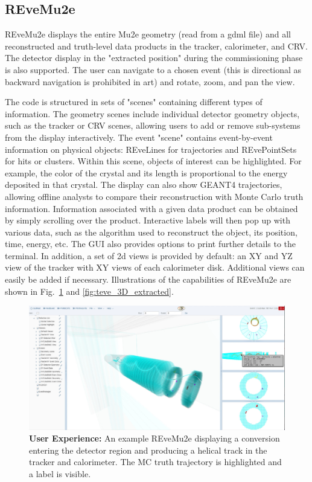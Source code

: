 \subsection{REveMu2e}

REveMu2e displays the entire Mu2e geometry (read from a gdml file) and all reconstructed and truth-level data products in the tracker, calorimeter, and CRV. The detector display in the "extracted position" during the commissioning phase is also supported. The user can navigate to a chosen event (this is directional as backward navigation is prohibited in art) and rotate, zoom, and pan the view. 

The code is structured in sets of "scenes" containing different types of information. The geometry scenes include individual detector geometry objects, such as the tracker or CRV scenes, allowing users to add or remove sub-systems from the display interactively. The event "scene" contains event-by-event information on physical objects: REveLines for trajectories and REvePointSets for hits or clusters. Within this scene, objects of interest can be highlighted. For example, the color of the crystal and its length is proportional to the energy deposited in that crystal. The display can also show GEANT4 trajectories, allowing offline analysts to compare their reconstruction with Monte Carlo truth information. Information associated with a given data product can be obtained by simply scrolling over the product. Interactive labels will then pop up with various data, such as the algorithm used to reconstruct the object, its position, time, energy, etc. The GUI also provides options to print further details to the terminal. In addition, a set of 2d views is provided by default: an XY and YZ view of the tracker with XY views of each calorimeter disk. Additional views can easily be added if necessary. Illustrations of the capabilities of REveMu2e are shown in Fig.~\ref{fig:teve_3D_label} and \ref{fig:teve_3D_extracted}. 

\begin{figure}[htb]
\begin{center}
\includegraphics[width=0.9\linewidth]{figures/2D-REve-label.png}
\caption{\textbf{User Experience:} An example REveMu2e displaying a conversion entering the detector region and producing a helical track in the tracker and calorimeter. The MC truth trajectory is highlighted and a label is visible.}
\label{fig:teve_3D_label}
\end{center}
\end{figure}


